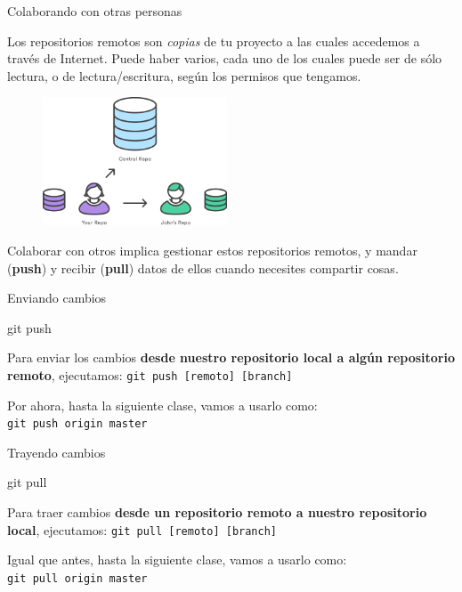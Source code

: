 \begin{frame}{Colaborando con otras personas}

    Los repositorios remotos son \textit{copias} de tu proyecto a las cuales accedemos a través
    de Internet. Puede haber varios, cada uno de los cuales
    puede ser de sólo lectura, o de lectura/escritura, según los permisos que tengamos.

    \begin{figure}[ht]
        \begin{center}
            \includegraphics[height=1.5in]{images/repo-remoto.png}
        \end{center}
    \end{figure}

    Colaborar con otros implica gestionar estos repositorios remotos, y mandar (\textbf{push}) y recibir (\textbf{pull})
    datos de ellos cuando necesites compartir cosas.

\end{frame}

\begin{frame}[t]{Enviando cambios}
    \begin{comando}
        git push
    \end{comando}

    \pause
    \begin{block}{}
        Para enviar los cambios \textbf{desde nuestro repositorio local a algún
        repositorio remoto}, ejecutamos: \texttt{git push [remoto] [branch]}

        \vspace{0.5em}

        Por ahora, hasta la siguiente clase, vamos a usarlo como:\\ \texttt{git push origin master}
    \end{block}
\end{frame}

\begin{frame}[t]{Trayendo cambios}
    \begin{comando}
        git pull
    \end{comando}

    \pause
    \begin{block}{}
        Para traer cambios \textbf{desde un repositorio remoto a nuestro repositorio local},
        ejecutamos: \texttt{git pull [remoto] [branch]}

        \vspace{0.5em}

        Igual que antes, hasta la siguiente clase, vamos a usarlo como:\\ \texttt{git pull origin master}
    \end{block}
\end{frame}

